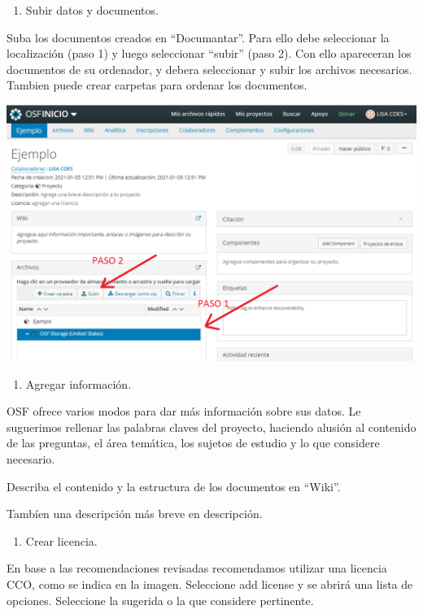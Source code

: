 \documentclass[
  14pt,
]{book}
\providecommand{\tightlist}{%
  \setlength{\itemsep}{0pt}\setlength{\parskip}{0pt}}
\begin{document}
\begin{enumerate}
\def\labelenumi{\arabic{enumi}.}
\setcounter{enumi}{2}
\tightlist
\item
  Subir datos y documentos.
\end{enumerate}

Suba los documentos creados en ``Documantar''. Para ello debe seleccionar la localización (paso 1) y luego seleccionar ``subir'' (paso 2). Con ello apareceran los documentos de su ordenador, y debera seleccionar y subir los archivos necesarios. Tambien puede crear carpetas para ordenar los documentos.

\begin{center}\includegraphics[width=0.5\linewidth,]{images/subirdatos} \end{center}

\begin{enumerate}
\def\labelenumi{\arabic{enumi}.}
\setcounter{enumi}{3}
\tightlist
\item
  Agregar información.
\end{enumerate}

OSF ofrece varios modos para dar más información sobre sus datos. Le suguerimos rellenar las palabras claves del proyecto, haciendo alusión al contenido de las preguntas, el área temática, los sujetos de estudio y lo que considere necesario.

Describa el contenido y la estructura de los documentos en ``Wiki''.

Tambíen una descripción más breve en descripción.

\begin{enumerate}
\def\labelenumi{\arabic{enumi}.}
\setcounter{enumi}{4}
\tightlist
\item
  Crear licencia.
\end{enumerate}

En base a las recomendaciones revisadas recomendamos utilizar una licencia CCO, como se indica en la imagen. Seleccione add license y se abrirá una lista de opciones. Seleccione la sugerida o la que considere pertinente.
\end{document}
